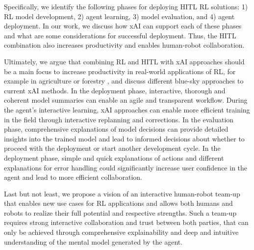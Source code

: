 \documentclass[twoside,11pt]{article}
\begin{document}
Specifically, we identify the following phases for deploying HITL RL solutions: 1) RL model development, 2) agent learning, 3) model evaluation, and 4) agent deployment. In our work, we discuss how xAI can support each of these phases and what are some considerations for successful deployment. Thus, the HITL combination also increases productivity and enables human-robot collaboration.

Ultimately, we argue that combining RL and HITL with xAI approaches should be a main focus to increase productivity in real-world applications of RL, for example in agriculture or forestry \citep{Holzinger:2022:DigitalTrans}, and discuss different blue-sky approaches to current xAI methods. In the deployment phase, interactive, thorough and coherent model summaries can enable an agile and transparent workflow. During the agent's interactive learning, xAI approaches can enable more efficient training in the field through interactive replanning and corrections. In the evaluation phase, comprehensive explanations of model decisions can provide detailed insights into the trained model and lead to informed decisions about whether to proceed with the deployment or start another development cycle. In the deployment phase, simple and quick explanations of actions and different explanations for error handling could significantly increase user confidence in the agent and lead to more efficient collaboration.

Last but not least, we propose a vision of an interactive human-robot team-up that enables new use cases for RL applications and allows both humans and robots to realize their full potential and respective strengths. Such a team-up requires strong interactive collaboration and trust between both parties, that can only be achieved through comprehensive explainability and deep and intuitive understanding of the mental model generated by the agent.
\end{document}

